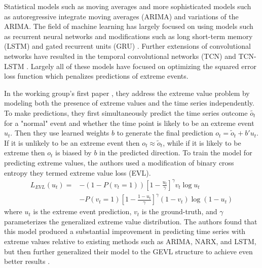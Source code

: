 \documentclass[conference]{IEEEtran}
\begin{document}
Statistical models such as moving averages and more sophisticated models such as autoregressive integrate moving averages (ARIMA) \cite{shumwayTimeSeriesData2019} and variations of the ARIMA. The field of machine learning has largely focused on using models such as recurrent neural networks and modifications such as long short-term memory (LSTM) and gated recurrent units (GRU) \cite{liptonCriticalReviewRecurrent2015}. Further extensions of convolutional networks have resulted in the  temporal convolutional networks (TCN) and TCN-LSTM \cite{leaTemporalConvolutionalNetworks2017, zhangEnhancingTimeSeries2021}. Largely all of these models have focused on optimizing the squared error loss function which penalizes predictions of extreme events.

In the working group's first paper \cite{dingModelingExtremeEvents2019}, they address the extreme value problem by modeling both the presence of extreme values and the time series independently. To make predictions, they first simultaneously predict the time series outcome $\tilde{o_t}$ for a "normal" event and whether the time point is likely to be an extreme event $u_t$. Then they use learned weights $b$ to generate the final prediction $o_t = \tilde{o}_t + b'u_t$. If it is unlikely to be an extreme event then $o_t \approx \tilde{o}_t$, while if it is likely to be extreme then $o_t$ is biased by $b$ in the predicted direction. To train the model for predicting extreme values, the authors used a modification of binary cross entropy they termed extreme value loss (EVL). 
\begin{align*}
L_{EVL}(u_t) = &-(1 - P(v_t = 1))[1 - \frac{u_t}{\gamma}]^\gamma v_t \log u_t \\
    &- P(v_t = 1)[1 - \frac{1-u_t}{\gamma}]^\gamma (1-v_t) \log (1-u_t)
\end{align*}
where $u_t$ is the extreme event prediction, $v_t$ is the ground-truth, and $\gamma$ parameterizes the generalized extreme value distribution. The authors found that this model produced a substantial improvement in predicting time series with extreme values relative to existing methods such as ARIMA, NARX, and LSTM, but then further generalized their model to the GEVL structure to achieve even better results \cite{zhangEnhancingTimeSeries2021}. 
\end{document}

